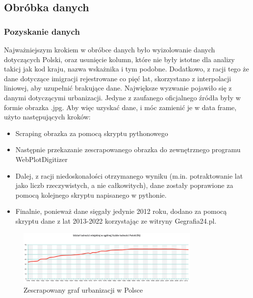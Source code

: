 \documentclass[11pt]{article}
\begin{document}
\subsection{Obróbka danych}
\subsubsection{Pozyskanie danych}
Najważniejszym krokiem w obróbce danych było wyizolowanie danych dotyczących Polski, oraz usunięcie kolumn, które nie były istotne dla analizy takicj jak kod kraju, nazwa wskażnika i tym podobne.
Dodatkowo, z racji tego że dane dotyczące imigracji rejestrowane co pięć lat, skorzystano z interpolacji liniowej, aby uzupełnić brakujące dane.
Największe wyzwanie pojawiło się z danymi dotyczącymi urbanizacji. Jedyne z zaufanego oficjalnego źródła były w formie obrazka .jpg.
Aby więc uzyskać dane, i móc zamienić je w data frame, użyto następujących kroków:
\begin{itemize}
\item Scraping obrazka za pomocą skryptu pythonowego
\item Następnie przekazanie zescrapowanego obrazka do zewnętrznego programu WebPlotDigitizer\cite{wpd}
\item Dalej, z racji niedoskonałości otrzymanego wyniku (m.in. potraktowanie lat jako liczb rzeczywistych, a nie całkowitych), dane zostały poprawione za pomocą kolejnego skryptu napisanego w pythonie.
\item Finalnie, ponieważ dane sięgały jedynie 2012 roku, dodano za pomocą skryptu dane z lat 2013-2022 korzystając ze witryny Gegrafia24.pl\cite{gf24}. 
\end{itemize}
\begin{figure}[H]
        \centering
        \includegraphics[width=0.8\textwidth]{urbanizacjawPolsce.png}
        \caption{Zescrapowany graf urbanizacji w Polsce}
\end{figure}
\end{document}

